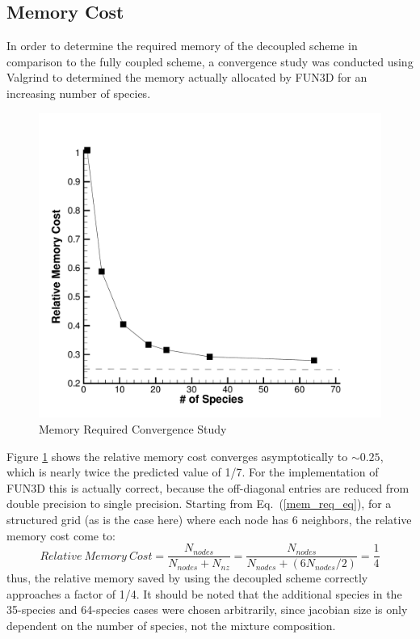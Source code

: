 \documentclass[]{aiaa-tc}%
\begin{document}
\subsection{Memory Cost}

In order to determine the required memory of the decoupled scheme in comparison to the fully coupled scheme, a convergence study was conducted using Valgrind\cite{valgrind} to determined the memory actually allocated by FUN3D for an increasing number of species.  
%
\begin{figure}
\begin{center}
\includegraphics{mem_req}
\caption{Memory Required Convergence Study}
\label{mem_req}
\end{center}
\end{figure}
%
Figure \ref{mem_req} shows the relative memory cost converges asymptotically to $\sim 0.25$, which is nearly twice the predicted value of 1/7.  For the implementation of FUN3D this is actually correct, because the off-diagonal entries are reduced from double precision to single precision.  Starting from Eq.~(\ref{mem_req_eq}), for a structured grid (as is the case here) where each node has 6 neighbors, the relative memory cost come to:
%
\begin{equation}
	Relative\ Memory\ Cost = \frac{N_{nodes}}{N_{nodes} + N_{nz}} = \frac{N_{nodes}}{N_{nodes} + (6N_{nodes}/2)}=\frac{1}{4}
\end{equation}
%
thus, the relative memory saved by using the decoupled scheme correctly approaches a factor of 1/4.  It should be noted that the additional species in the 35-species and 64-species cases were chosen arbitrarily, since jacobian size is only dependent on the number of species, not the mixture composition.
\end{document}
